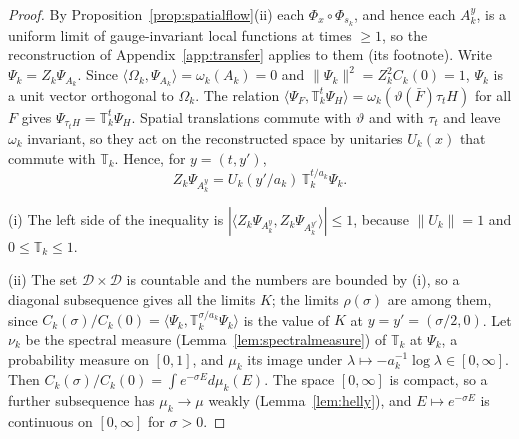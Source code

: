 \documentclass[11pt]{amsart}
\theoremstyle{definition}
\theoremstyle{remark}
\numberwithin{equation}{section}
\newcommand{\ip}[2]{\langle #1,#2\rangle}
\begin{document}
\begin{proof}
By Proposition~\ref{prop:spatialflow}(ii) each $\Phi_x\circ\Phi_{s_k}$, and
hence each $A^y_k$, is a uniform limit of gauge-invariant local functions at
times $\ge1$, so the reconstruction of Appendix~\ref{app:transfer} applies to
them (its footnote). Write $\Psi_k=Z_k\Psi_{A_k}$. Since
$\ip{\Omega_k}{\Psi_{A_k}}=\omega_k(A_k)=0$ and $\|\Psi_k\|^2=Z_k^2C_k(0)=1$,
$\Psi_k$ is a unit vector orthogonal to $\Omega_k$. The relation
$\ip{\Psi_F}{\mathbb T_k^t\Psi_H}=\omega_k(\vartheta(\bar F)\tau_tH)$ for all $F$
gives $\Psi_{\tau_tH}=\mathbb T_k^t\Psi_H$. Spatial translations commute with
$\vartheta$ and with $\tau_t$ and leave $\omega_k$ invariant, so they act on the
reconstructed space by unitaries $U_k(x)$ that commute with $\mathbb T_k$.
Hence, for $y=(t,y')$,
\[
Z_k\Psi_{A^y_k}=U_k(y'/a_k)\,\mathbb T_k^{t/a_k}\Psi_k .
\]

(i) The left side of the inequality is $|\ip{Z_k\Psi_{A^y_k}}{Z_k
\Psi_{A^{y'}_k}}|\le1$, because $\|U_k\|=1$ and $0\le\mathbb T_k\le1$.

(ii) The set $\mathcal D\times\mathcal D$ is countable and the numbers are
bounded by (i), so a diagonal subsequence gives all the limits $K$; the limits
$\rho(\sigma)$ are among them, since $C_k(\sigma)/C_k(0)=
\ip{\Psi_k}{\mathbb T_k^{\sigma/a_k}\Psi_k}$ is the value of $K$ at
$y=y'=(\sigma/2,0)$. Let $\nu_k$ be the spectral measure (Lemma~\ref{lem:spectralmeasure}) of $\mathbb T_k$ at
$\Psi_k$, a probability measure on $[0,1]$, and $\mu_k$ its image under
$\lambda\mapsto-a_k^{-1}\log\lambda\in[0,\infty]$. Then
$C_k(\sigma)/C_k(0)=\int e^{-\sigma E}d\mu_k(E)$. The space $[0,\infty]$ is
compact, so a further subsequence has $\mu_k\to\mu$ weakly (Lemma~\ref{lem:helly}), and
$E\mapsto e^{-\sigma E}$ is continuous on $[0,\infty]$ for $\sigma>0$.


\end{proof}
\end{document}
